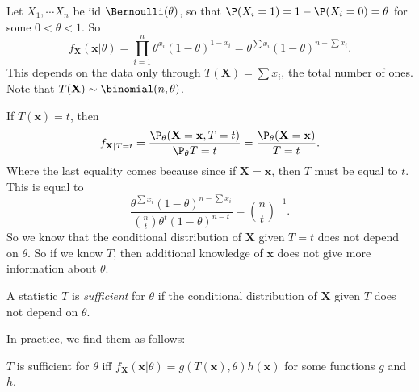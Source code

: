 \documentclass[a4paper]{article}
\begin{document}
\begin{eg}
  Let $X_1, \cdots X_n$ be iid $\Bernoulli(\theta)$, so that $\P(X_i = 1) = 1 - \P(X_i = 0) = \theta$ for some $0 < \theta < 1$. So
  \[
    f_{\mathbf{X}} (\mathbf{x}|\theta) = \prod_{i = 1}^n \theta^{x_i}(1 - \theta)^{1 - x_i} = \theta^{\sum x_i}(1 - \theta)^{n - \sum x_i}.
  \]
  This depends on the data only through $T(\mathbf{X}) = \sum x_i$, the total number of ones. Note that $T(\mathbf{X})\sim \binomial(n, \theta)$.

  If $T(\mathbf{x}) = t$, then
  \[
    f_{\mathbf{X}|T = t} = \frac{\P_\theta(\mathbf{X} = \mathbf{x}, T = t)}{\P_\theta T = t} = \frac{\P_\theta(\mathbf{X} = \mathbf{x})}{T = t}.
  \]
  Where the last equality comes because since if $\mathbf{X} = \mathbf{x}$, then $T$ must be equal to $t$. This is equal to
  \[
    \frac{\theta^{\sum x_i}(1 - \theta)^{n - \sum x_i}}{\binom{n}{t}\theta^t (1 - \theta)^{n - t}} = \binom{n}{t}^{-1}.
  \]
  So we know that the conditional distribution of $\mathbf{X}$ given $T = t$ does not depend on $\theta$. So if we know $T$, then additional knowledge of $\mathbf{x}$ does not give more information about $\theta$.
\end{eg}

\begin{defi}
  A statistic $T$ is \emph{sufficient} for $\theta$ if the conditional distribution of $\mathbf{X}$ given $T$ does not depend on $\theta$.
\end{defi}

In practice, we find them as follows:
\begin{thm}
  $T$ is sufficient for $\theta$ iff $f_{\mathbf{X}}(\mathbf{x} |\theta) = g(T(\mathbf{x}), \theta)h(\mathbf{x})$ for some functions $g$ and $h$.
\end{thm}
\end{document}
